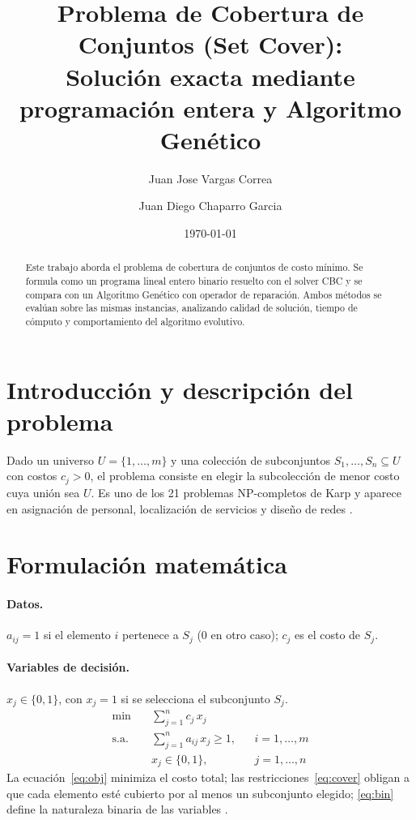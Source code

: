 \documentclass[11pt,a4paper]{article}
\title{Problema de Cobertura de Conjuntos (Set Cover):\\
Soluci\'on exacta mediante programaci\'on entera y Algoritmo Gen\'etico}
\author{Juan Jose Vargas Correa \and Juan Diego Chaparro Garcia}
\date{\today}
\begin{document}
\maketitle

\begin{abstract}
Este trabajo aborda el problema de cobertura de conjuntos de costo m\'inimo. Se formula como un
programa lineal entero binario resuelto con el solver CBC y se compara con un Algoritmo Gen\'etico
con operador de reparaci\'on. Ambos m\'etodos se eval\'uan sobre las mismas instancias, analizando
calidad de soluci\'on, tiempo de c\'omputo y comportamiento del algoritmo evolutivo.
\end{abstract}

\section{Introducci\'on y descripci\'on del problema}
Dado un universo $U=\{1,\dots,m\}$ y una colecci\'on de subconjuntos $S_1,\dots,S_n\subseteq U$ con
costos $c_j>0$, el problema consiste en elegir la subcolecci\'on de menor costo cuya uni\'on sea $U$.
Es uno de los 21 problemas NP-completos de Karp \cite{karp1972,garey1979} y aparece en
asignaci\'on de personal, localizaci\'on de servicios y dise\~no de redes \cite{caprara2000}.

\section{Formulaci\'on matem\'atica}
\paragraph{Datos.} $a_{ij}=1$ si el elemento $i$ pertenece a $S_j$ (0 en otro caso); $c_j$ es el costo de $S_j$.
\paragraph{Variables de decisi\'on.}
$x_j\in\{0,1\}$, con $x_j=1$ si se selecciona el subconjunto $S_j$.
\begin{align}
\min\quad & \sum_{j=1}^{n} c_j\,x_j \label{eq:obj}\\
\text{s.a.}\quad & \sum_{j=1}^{n} a_{ij}\,x_j \ge 1, && i=1,\dots,m \label{eq:cover}\\
& x_j\in\{0,1\}, && j=1,\dots,n \label{eq:bin}
\end{align}
La ecuaci\'on~\eqref{eq:obj} minimiza el costo total; las restricciones~\eqref{eq:cover} obligan a que
cada elemento est\'e cubierto por al menos un subconjunto elegido; \eqref{eq:bin} define la naturaleza
binaria de las variables \cite{wolsey2020}.
\end{document}
